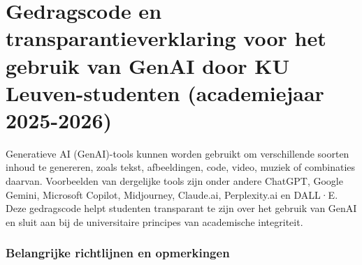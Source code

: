 \chapter*{Gedragscode en transparantieverklaring voor het gebruik van GenAI door KU Leuven-studenten (academiejaar 2025-2026)}
Generatieve AI (GenAI)-tools kunnen worden gebruikt om verschillende soorten inhoud te genereren, zoals tekst, afbeeldingen, code, video, muziek of combinaties daarvan. Voorbeelden van dergelijke tools zijn onder andere ChatGPT, Google Gemini, Microsoft Copilot, Midjourney, Claude.ai, Perplexity.ai en DALL·E.
\newline
\newline
Deze gedragscode helpt studenten transparant te zijn over het gebruik van GenAI en sluit aan bij de universitaire principes van academische integriteit.

\subsection*{Belangrijke richtlijnen en opmerkingen}

